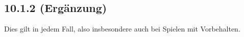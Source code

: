\subsection*{10.1.2 (Ergänzung)}

Dies gilt in jedem Fall, also insbesondere auch bei Spielen mit
Vorbehalten.









